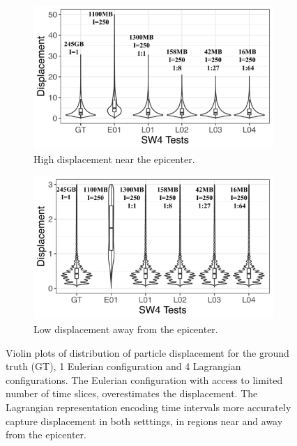 \begin{figure}[!t]
\begin{subfigure}{0.495\textwidth}
\centering
\includegraphics[width=\linewidth]{Images/sw4_violinplot1.pdf}
\vspace{-5mm}
\caption{High displacement near the epicenter.}
\label{fig:epicenter}
\end{subfigure}
\begin{subfigure}{0.495\textwidth}
\centering
\includegraphics[width=\linewidth]{Images/sw4_violinplot2.pdf}
\vspace{-5mm}
\caption{Low displacement away from the epicenter.}
\label{fig:clusters}
\end{subfigure}
\vspace{-2mm}
\caption{Violin plots of distribution of particle displacement for the ground truth (GT), 1 Eulerian configuration and 4 Lagrangian configurations. The Eulerian configuration with access to limited number of time slices, overestimates the displacement. The Lagrangian representation encoding time intervals more accurately capture displacement in both setttings, in regions near and away from the epicenter.}
\vspace{-5mm}
\label{fig:sw4_violinplot}
\end{figure}
